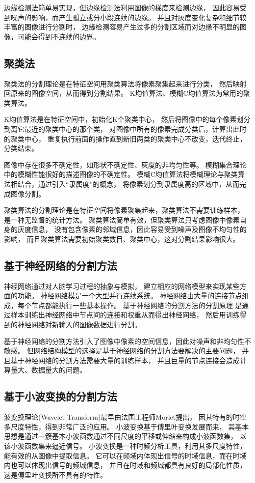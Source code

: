 边缘检测法简单易实现，但边缘检测法利用图像的梯度来检测边缘，
因此容易受到噪声的影响，而产生孤立或分小段连续的边缘。
并且对灰度变化复杂和细节较丰富的图像进行分割时，
边缘检测容易产生过多的分割区域而对边缘不明显的图像，可能会得到不连续的边界。

\subsection{聚类法}
聚类法的分割理论是在特征空间用聚类算法将像素聚集起来进行分类，
然后映射回原来的图像空间，从而得到分割结果。
K均值算法、模糊C均值算法为常用的聚类算法。

K均值算法是在特征空间中，初始化K个聚类中心，
然后将图像中的每个像素划分到离它最近的聚类中心的那个类，
对图像中所有的像素完成分类后，计算出此时的聚类中心，
重复执行前面的操作直到新旧两类的聚类中心不改变，迭代终止，分类结束。

图像中存在很多不确定性，如形状不确定性、灰度的非均匀性等。
模糊集合理论中的模糊性能很好的描述图像的不确定性。
模糊C均值算法将模糊理论与聚类算法相结合，通过引入``隶属度''的概念，
将像素划分到隶属度高的区域中，从而完成图像分割。

聚类算法的分割理论是在特征空间将像素聚集起来，聚类算法不需要训练样本，
是一种无监督的统计方法。
聚类算法简单有效，但聚类算法只考虑图像中像素自身的灰度信息，
没有包含像素的邻域信息，因此容易受到噪声及图像不均匀性的影响，
而且聚类算法需要初始聚类数目、聚类中心，这对分割结果影响很大。

\subsection{基于神经网络的分割方法}
神经网络通过对人脑学习过程的抽象与模拟，
建立相应的网络模型来实现某些方面的功能。
神经网络模是一个大型并行连续系统。
神经网络由大量的连接节点组成，每个节点都能执行一些基本操作。
基于神经网络的分割方法的分割原理
是通过样本训练出神经网络中节点间的连接和权重从而得出神经网络，
然后用训练得到的神经网络对新输入的图像数据进行分割。

基于神经网络的分割方法引入了图像中像素的空间信息，因此对噪声和非均匀性不敏感。
但网络结构模型的选择是基于神经网络的分割方法要解决的主要问题，
并且基于神经网络的分割方法需要大量的训练样本，
并且巨量的节点连接会造成计算量大、数据量大的问题。

\subsection{基于小波变换的分割方法}
波变换理论(Wavelet Transform)最早由法国工程师Morlet提出，
因其特有的时空多尺度特性，得到非常广泛的应用。
小波变换基于傅里叶变换发展而来，
其基本思想是通过一簇基本小波函数通过不同尺度的平移或伸缩来构成小波函数集，
以该小波函数集来逼近信号。
小波变换是一种时频分析工具，利用其多尺度特性，能有效的从图像中提取信息。
它可以在频域内体现出信号的时域信息，而在时域内也可以体现出信号的频域信息，
并且在时域和频域都具有良好的局部化性质，这是傅里叶变换所不具有的特性。

